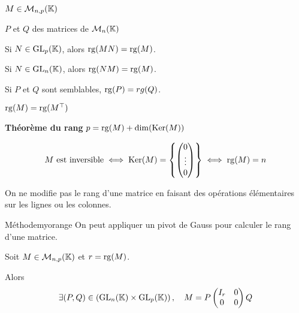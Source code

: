     \begin{prop}{}{}
        \begin{soit}
            \item $M \in \mathcal{M}_{n,p}(\mathbb{K})$
            \item $P$ et $Q$ des matrices de $\mathcal{M}_{n}(\mathbb{K})$
        \end{soit}

        \begin{alors}
            \item Si $N \in \operatorname{GL}_p(\mathbb{K})$, alors $\operatorname{rg}(MN) = \operatorname{rg}(M)$.
            \item Si $N \in \operatorname{GL}_n(\mathbb{K})$, alors $\operatorname{rg}(NM) = \operatorname{rg}(M)$.
            \item Si $P$ et $Q$ sont semblables, $\operatorname{rg}(P) = rg(Q)$.
            \item $\operatorname{rg}(M) = \operatorname{rg}(M^{\top})$
            \item \textbf{Théorème du rang} \quad $p = \operatorname{rg}(M) + \dim(\operatorname{Ker}(M))$
            \item \[ M \text{ est inversible} \iff \operatorname{Ker}(M) = \left\{ \begin{pmatrix}
            0 \\
            \vdots \\
            0
        \end{pmatrix} \right\} \iff \operatorname{rg}(M) = n \]
        \end{alors}
    \end{prop}

    \begin{coro}{}{}
        On ne modifie pas le rang d’une matrice en faisant des opérations élémentaires sur les lignes ou les colonnes.
    \end{coro}

    \begin{omed}{Méthode}{myorange}
        On peut appliquer un pivot de Gauss pour calculer le rang d’une matrice.
    \end{omed}

    \begin{theo}{}{}
        Soit $M \in \mathcal{M}_{n,p}(\mathbb{K})$ et $r = \operatorname{rg}(M)$.

        Alors
        \[ \exists (P,Q) \in \left(\operatorname{GL}_n(\mathbb{K}) \times \operatorname{GL}_p(\mathbb{K})\right), \quad  M = P \begin{pmatrix}
                I_r & 0 \\
                0 & 0
            \end{pmatrix} Q \]
    \end{theo}

